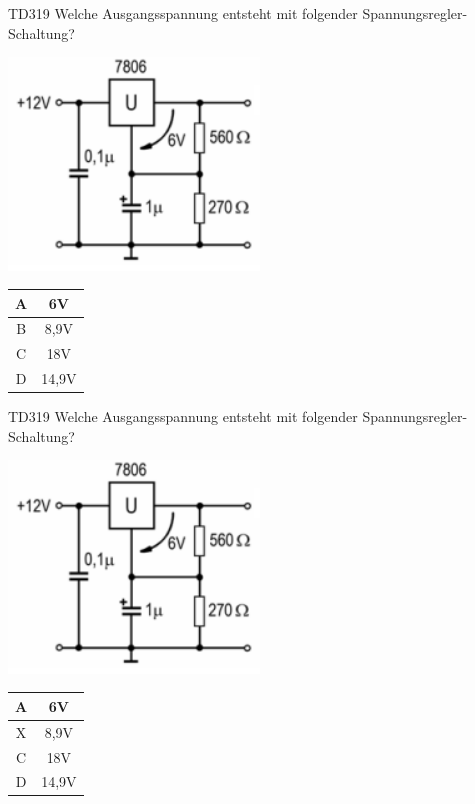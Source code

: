 \begin{frame}
    \begin{center} \Large
        \begin{block}{TD319}
		\large Welche Ausgangsspannung entsteht mit folgender Spannungsregler-Schaltung?\\
		\begin{center}
		\includegraphics[width=0.5\textwidth]{a17/TD319.png}\\
		\end{center}
    	\end{block}
        \begin{tabular}{|c|c|}
        \hline
        A & 6V \\ \hline
        B & 8,9V \\ \hline
        C & 18V \\ \hline
        D & 14,9V \\ \hline
        \end{tabular}
    \end{center}
\end{frame}
\begin{frame}
    \begin{center} \Large
        \begin{block}{TD319}
		\large Welche Ausgangsspannung entsteht mit folgender Spannungsregler-Schaltung?\\
		\begin{center}
		\includegraphics[width=0.5\textwidth]{a17/TD319.png}\\
		\end{center}
    	\end{block}
        \begin{tabular}{|c|c|}
        \hline
        A & 6V \\ \hline
        X & 8,9V \\ \hline
        C & 18V \\ \hline
        D & 14,9V \\ \hline
        \end{tabular}
    \end{center}
\end{frame}

